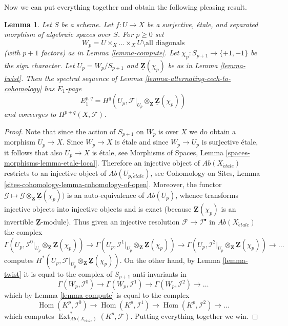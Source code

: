 \documentclass{stacks-project}
\theoremstyle{plain}
\newtheorem{lemma}[subsection]{Lemma}
\theoremstyle{definition}
\theoremstyle{remark}
\numberwithin{equation}{subsection}
\def\Hom{\mathop{\mathrm{Hom}}\nolimits}
\def\Ext{\mathop{\mathrm{Ext}}\nolimits}
\def\etale{{\acute{e}tale}}
\begin{document}
\noindent
Now we can put everything together and obtain the following
pleasing result.

\begin{lemma}
\label{lemma-alternating-spectral-sequence}
Let $S$ be a scheme. Let $f : U \to X$ be a surjective, \'etale, and
separated morphism of algebraic spaces over $S$. For $p \geq 0$ set
$$
W_p = U \times_X \ldots \times_X U \setminus \text{all diagonals}
$$
(with $p + 1$ factors) as in Lemma \ref{lemma-compute}.
Let $\chi_p : S_{p + 1} \to \{+1, -1\}$ be the sign character.
Let $U_p = W_p/S_{p + 1}$ and $\underline{\mathbf{Z}}(\chi_p)$ be as in
Lemma \ref{lemma-twist}.
Then the spectral sequence of
Lemma \ref{lemma-alternating-cech-to-cohomology}
has $E_1$-page
$$
E_1^{p, q} =
H^q(U_p, \mathcal{F}|_{U_p} \otimes_\mathbf{Z} \underline{\mathbf{Z}}(\chi_p))
$$
and converges to $H^{p + q}(X, \mathcal{F})$.
\end{lemma}

\begin{proof}
Note that since the action of $S_{p + 1}$ on $W_p$ is over $X$ we do
obtain a morphism $U_p \to X$. Since $W_p \to X$ is \'etale and since
$W_p \to U_p$ is surjective \'etale, it follows
that also $U_p \to X$ is \'etale, see
Morphisms of Spaces, Lemma \ref{spaces-morphisms-lemma-etale-local}.
Therefore an injective object of
$\textit{Ab}(X_\etale)$ restricts to an injective object of
$\textit{Ab}(U_{p, \etale})$, see
Cohomology on Sites, Lemma \ref{sites-cohomology-lemma-cohomology-of-open}.
Moreover, the functor
$\mathcal{G} \mapsto
\mathcal{G} \otimes_\mathbf{Z} \underline{\mathbf{Z}}(\chi_p))$
is an auto-equivalence of $\textit{Ab}(U_p)$, whence transforms injective
objects into injective objects and is exact (because
$\underline{\mathbf{Z}}(\chi_p)$ is an invertible
$\underline{\mathbf{Z}}$-module). Thus given an injective resolution
$\mathcal{F} \to \mathcal{I}^\bullet$ in $\textit{Ab}(X_\etale)$
the complex
$$
\Gamma(U_p,
\mathcal{I}^0|_{U_p} \otimes_\mathbf{Z} \underline{\mathbf{Z}}(\chi_p))
\to
\Gamma(U_p,
\mathcal{I}^1|_{U_p} \otimes_\mathbf{Z} \underline{\mathbf{Z}}(\chi_p))
\to
\Gamma(U_p,
\mathcal{I}^2|_{U_p} \otimes_\mathbf{Z} \underline{\mathbf{Z}}(\chi_p))
\to \ldots
$$
computes
$H^*(U_p,
\mathcal{F}|_{U_p} \otimes_\mathbf{Z} \underline{\mathbf{Z}}(\chi_p))$.
On the other hand, by
Lemma \ref{lemma-twist}
it is equal to the complex of $S_{p + 1}$-anti-invariants in
$$
\Gamma(W_p, \mathcal{I}^0) \to
\Gamma(W_p, \mathcal{I}^1) \to
\Gamma(W_p, \mathcal{I}^2) \to \ldots
$$
which by
Lemma \ref{lemma-compute}
is equal to the complex
$$
\Hom(K^p, \mathcal{I}^0) \to
\Hom(K^p, \mathcal{I}^1) \to
\Hom(K^p, \mathcal{I}^2) \to \ldots
$$
which computes
$\Ext^*_{\textit{Ab}(X_\etale)}(K^p, \mathcal{F})$.
Putting everything together we win.
\end{proof}
\end{document}
